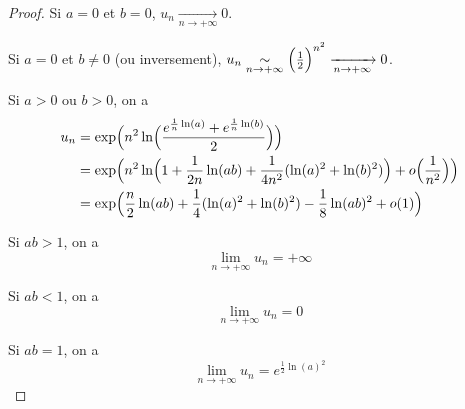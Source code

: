 \documentclass[12pt]{article}
\begin{document}
\begin{proof}
	Si $a=0$ et $b=0$, $u_{n}\xrightarrow[n\to+\infty]{}0$.

	Si $a=0$ et $b\neq0$ (ou inversement), $u_{n}\underset{n\to+\infty}{\sim}\Bigl(\frac{1}{2}\Bigr)^{n^{2}}\xrightarrow[n\to+\infty]{}0$.

	Si $a>0$ ou $b>0$, on a
	\begin{align}
		u_{n}
		&=\exp\Bigl(n^{2}\ln\Bigl(\frac{e^{\frac{1}{n}\ln(a)}+e^{\frac{1}{n}\ln(b)}}{2}\Bigr)\Bigr)\\
		&=\exp\Bigl(n^{2}\ln\Bigl(1+\frac{1}{2n}\ln(ab)+\frac{1}{4n^2}(\ln(a)^{2}+\ln(b)^{2})\Bigr)+o\Bigl(\frac{1}{n^{2}}\Bigr)\Bigr)\\
		&=\exp\Bigl(\frac{n}{2}\ln(ab)+\frac{1}{4}(\ln(a)^{2}+\ln(b)^{2})-\frac{1}{8}\ln(ab)^2+o(1)\Bigr)
	\end{align}

	Si $ab>1$, on a 
	\begin{equation}\boxed{\lim\limits_{n\to+\infty} u_{n}=+\infty}\end{equation}
	
	Si $ab<1$, on a 
	\begin{equation}\boxed{\lim\limits_{n\to+\infty} u_{n}=0}\end{equation}

	Si $ab=1$, on a 
	\begin{equation}\boxed{\lim\limits_{n\to+\infty} u_{n}=e^{\frac{1}{2}\ln(a)^{2}}}\end{equation}
\end{proof}
\end{document}
